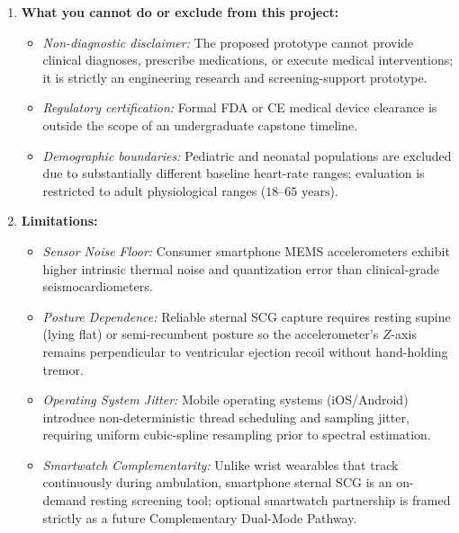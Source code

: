 \begin{enumerate}
	\item \textbf{What you cannot do or exclude from this project:}
	\begin{itemize}
		\item \textit{Non-diagnostic disclaimer:} The proposed prototype cannot provide clinical diagnoses, prescribe medications, or execute medical interventions; it is strictly an engineering research and screening-support prototype.
		\item \textit{Regulatory certification:} Formal FDA or CE medical device clearance is outside the scope of an undergraduate capstone timeline.
		\item \textit{Demographic boundaries:} Pediatric and neonatal populations are excluded due to substantially different baseline heart-rate ranges; evaluation is restricted to adult physiological ranges ($18\text{--}65\text{ years}$).
	\end{itemize}
	
	\item \textbf{Limitations:}
	\begin{itemize}
		\item \textit{Sensor Noise Floor:} Consumer smartphone MEMS accelerometers exhibit higher intrinsic thermal noise and quantization error than clinical-grade seismocardiometers.
		\item \textit{Posture Dependence:} Reliable sternal SCG capture requires resting supine (lying flat) or semi-recumbent posture so the accelerometer's $Z$-axis remains perpendicular to ventricular ejection recoil without hand-holding tremor.
		\item \textit{Operating System Jitter:} Mobile operating systems (iOS/Android) introduce non-deterministic thread scheduling and sampling jitter, requiring uniform cubic-spline resampling prior to spectral estimation.
		\item \textit{Smartwatch Complementarity:} Unlike wrist wearables that track continuously during ambulation, smartphone sternal SCG is an on-demand resting screening tool; optional smartwatch partnership is framed strictly as a future Complementary Dual-Mode Pathway.
	\end{itemize}
	

\end{enumerate}
